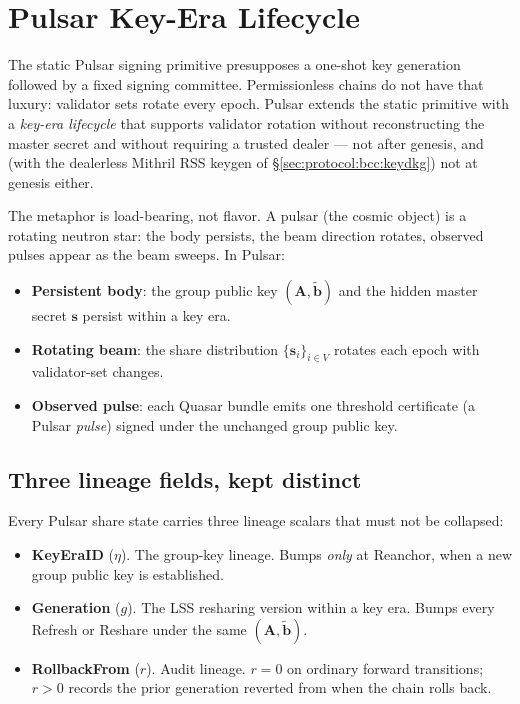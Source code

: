 \section{Pulsar Key-Era Lifecycle}
\label{sec:lifecycle}

The static Pulsar signing primitive presupposes a one-shot key
generation followed by a fixed signing committee. Permissionless chains
do not have that luxury: validator sets rotate every epoch. Pulsar
extends the static primitive with a \emph{key-era lifecycle} that supports
validator rotation without reconstructing the master secret and without
requiring a trusted dealer --- not after genesis, and (with the dealerless
Mithril RSS keygen of \S\ref{sec:protocol:bcc:keydkg}) not at genesis
either.

The metaphor is load-bearing, not flavor. A pulsar (the cosmic object)
is a rotating neutron star: the body persists, the beam direction
rotates, observed pulses appear as the beam sweeps. In Pulsar:
\begin{itemize}[leftmargin=2em,nosep]
  \item \textbf{Persistent body}: the group public key
        $(\mathbf{A}, \tilde{\mathbf{b}})$ and the hidden master
        secret $\mathbf{s}$ persist within a key era.
  \item \textbf{Rotating beam}: the share distribution
        $\{\mathbf{s}_i\}_{i \in V}$ rotates each epoch with
        validator-set changes.
  \item \textbf{Observed pulse}: each Quasar bundle emits one
        threshold certificate (a Pulsar \emph{pulse}) signed under the
        unchanged group public key.
\end{itemize}

\subsection{Three lineage fields, kept distinct}
\label{sec:lifecycle:lineage}

Every Pulsar share state carries three lineage scalars that must not be
collapsed:

\begin{itemize}[leftmargin=2em,nosep]
  \item \textbf{KeyEraID} ($\eta$). The group-key lineage. Bumps
        \emph{only} at Reanchor, when a new group public key is
        established.
  \item \textbf{Generation} ($g$). The LSS resharing version within a
        key era. Bumps every Refresh or Reshare under the same
        $(\mathbf{A}, \tilde{\mathbf{b}})$.
  \item \textbf{RollbackFrom} ($r$). Audit lineage. $r=0$ on
        ordinary forward transitions; $r > 0$ records the prior
        generation reverted from when the chain rolls back.
\end{itemize}

